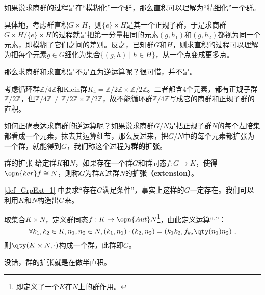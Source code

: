 


如果说求商群的过程是在“模糊化”一个群，那么直积可以理解为“精细化”一个群。

具体地，考虑群直积$G\times H$，则$\{e\}\times H$是其一个正规子群，于是求商群$G\times H/\{e\}\times H$的过程就是把第一分量相同的元素$(g, h_1)$和$(g, h_2)$都视为同一个元素，即模糊了它们之间的差别。反之，已知群$G$和$H$，则求直积的过程可以理解为把每个元素$g\in G$细化为集合$\{(g, h)\mid h\in H\}$，从一个点变成更多点。


那么求商群和求直积是不是互为逆运算呢？很可惜，并不是。



\begin{example}{}
考虑循环群$\mathbb{Z}/4\mathbb{Z}$和Klein群$K_4=\mathbb{Z}/2\mathbb{Z}\times \mathbb{Z}/2\mathbb{Z}$。二者都含$4$个元素，都有正规子群$\mathbb{Z}/2\mathbb{Z}$，但$\mathbb{Z}/4\mathbb{Z}\neq \mathbb{Z}/2\mathbb{Z}\times \mathbb{Z}/2\mathbb{Z}$，故不能循环群$\mathbb{Z}/4\mathbb{Z}$写成它的商群和正规子群的直积。
\end{example}




如何正确表达求商群的逆运算呢？如果说求商群$G/N$是把正规子群$N$的每个左陪集都看成一个元素，抹去其运算细节，那么反过来，把$G/N$中的每个元素都扩张为一个群，就能得到$G$，我们称这个过程为\textbf{群的扩张}。



\begin{definition}{群的扩张}\label{def_GrpExt_1}
给定群$K$和$N$，如果存在一个群$G$和群同态$f:G\to K$，使得$\opn{ker}f\cong N$，则称$G$为群$K$过群$N$的\textbf{扩张（extension）}。
\end{definition}


\autoref{def_GrpExt_1} 中要求“存在$G$满足条件”，事实上这样的$G$一定存在。我们可以利用$K$和$N$构造出$G$来。

取集合$K\times N$，定义群同态$f:K\to \opn{Aut}N$\footnote{即定义了一个$K$在$N$上的群作用。}，由此定义运算“$\cdot$”：
\begin{equation}
\forall k_1, k_2\in K, n_1, n_2\in N, (k_1, n_1)\cdot(k_2, n_2)=(k_1k_2, f_{k_2}\qty(n_1)n_2)~, 
\end{equation}
则$\qty(K\times N, \cdot)$构成一个群，此群即$G$。

没错，群的扩张就是在做半直积。
































